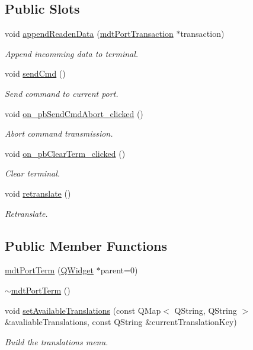\subsection*{Public Slots}
\begin{DoxyCompactItemize}
\item 
void \hyperlink{classmdt_port_term_a2c8de2e82437fc94420ccb542cc42bf2}{append\-Readen\-Data} (\hyperlink{classmdt_port_transaction}{mdt\-Port\-Transaction} $\ast$transaction)
\begin{DoxyCompactList}\small\item\em Append incomming data to terminal. \end{DoxyCompactList}\item 
void \hyperlink{classmdt_port_term_a7ec568c44f862fe7aee83f1a271ac6bb}{send\-Cmd} ()
\begin{DoxyCompactList}\small\item\em Send command to current port. \end{DoxyCompactList}\item 
void \hyperlink{classmdt_port_term_a1b232e686b401d7103eb1c682be330a9}{on\-\_\-pb\-Send\-Cmd\-Abort\-\_\-clicked} ()
\begin{DoxyCompactList}\small\item\em Abort command transmission. \end{DoxyCompactList}\item 
void \hyperlink{classmdt_port_term_abb3fc55837782dbea240b069a48b18ce}{on\-\_\-pb\-Clear\-Term\-\_\-clicked} ()
\begin{DoxyCompactList}\small\item\em Clear terminal. \end{DoxyCompactList}\item 
void \hyperlink{classmdt_port_term_a542e20f789bcdc5f2ddf2b6e698ceea2}{retranslate} ()
\begin{DoxyCompactList}\small\item\em Retranslate. \end{DoxyCompactList}\end{DoxyCompactItemize}
\subsection*{Public Member Functions}
\begin{DoxyCompactItemize}
\item 
\hyperlink{classmdt_port_term_a5e93890f53b5112be80983779a3ab233}{mdt\-Port\-Term} (\hyperlink{class_q_widget}{Q\-Widget} $\ast$parent=0)
\item 
\hyperlink{classmdt_port_term_a5576a15a2b6e39c149207ffdb7869ef7}{$\sim$mdt\-Port\-Term} ()
\item 
void \hyperlink{classmdt_port_term_af6f97444089eb87ec5db557a2ccb24db}{set\-Available\-Translations} (const Q\-Map$<$ Q\-String, Q\-String $>$ \&avaliable\-Translations, const Q\-String \&current\-Translation\-Key)
\begin{DoxyCompactList}\small\item\em Build the translations menu. \end{DoxyCompactList}\end{DoxyCompactItemize}


